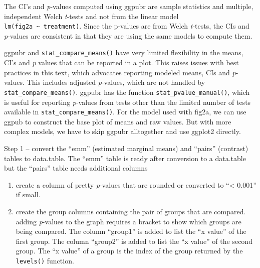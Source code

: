 \documentclass[]{book}
\newenvironment{Shaded}{\begin{snugshade}}{\end{snugshade}}
\newcommand{\KeywordTok}[1]{\textcolor[rgb]{0.13,0.29,0.53}{\textbf{#1}}}
\newcommand{\NormalTok}[1]{#1}
\newcommand{\OperatorTok}[1]{\textcolor[rgb]{0.81,0.36,0.00}{\textbf{#1}}}
\providecommand{\tightlist}{%
  \setlength{\itemsep}{0pt}\setlength{\parskip}{0pt}}
\begin{document}
The CI's and \emph{p}-values computed using ggpubr are sample statistics and multiple, independent Welch \emph{t}-tests and not from the linear model \texttt{lm(fig2a\ \textasciitilde{}\ treatment)}. Since the p-values are from Welch \emph{t}-tests, the CIs and \emph{p}-values are consistent in that they are using the same models to compute them.

ggpubr and \texttt{stat\_compare\_means()} have very limited flexibility in the means, CI's and \emph{p} values that can be reported in a plot. This raises issues with best practices in this text, which advocates reporting modeled means, CIs and \emph{p}-values. This includes adjusted \emph{p}-values, which are not handled by \texttt{stat\_compare\_means()}. ggpubr has the function \texttt{stat\_pvalue\_manual()}, which is useful for reporting \emph{p}-values from tests other than the limited number of tests available in \texttt{stat\_compare\_means()}. For the model used with fig2a, we can use ggpub to construct the base plot of means and raw values. But with more complex models, we have to skip ggpubr alltogether and use ggplot2 directly.

Step 1 -- convert the ``emm'' (estimated marginal means) and ``pairs'' (contrast) tables to data.table. The ``emm'' table is ready after conversion to a data.table but the ``pairs'' table needs additional columns

\begin{enumerate}
\def\labelenumi{\arabic{enumi}.}
\tightlist
\item
  create a column of pretty \emph{p}-values that are rounded or converted to ``\textless{} 0.001'' if small.
\item
  create the group columns containing the pair of groups that are compared. adding \emph{p}-values to the graph requires a bracket to show which groups are being compared. The column ``group1'' is added to list the ``x value'' of the first group. The column ``group2'' is added to list the ``x value'' of the second group. The ``x value'' of a group is the index of the group returned by the \texttt{levels()} function.
\end{enumerate}

\begin{Shaded}
\end{Shaded}
\end{document}
